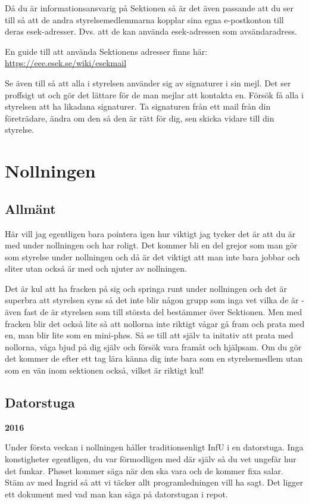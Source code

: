 \documentclass[10pt]{article}
\begin{document}
Då du är informationsansvarig på Sektionen så är det även passande att du ser till så att de andra styrelsemedlemmarna kopplar sina egna e-postkonton till deras esek-adresser. Dvs. att de kan använda esek-adressen som avsändaradress.

En guide till att använda Sektionens adresser finns här: \url{https://eee.esek.se/wiki/esekmail}

Se även till så att alla i styrelsen använder sig av signaturer i sin mejl. Det ser proffsigt ut och gör det lättare för de man mejlar att kontakta en. Försök få alla i styrelsen att ha likadana signaturer. Ta signaturen från ett mail från din företrädare, ändra om den så den är rätt för dig, sen skicka vidare till din styrelse.

\section{Nollningen}
\subsection{Allmänt}
Här vill jag egentligen bara pointera igen hur viktigt jag tycker det är att du är med under nollningen och har roligt. Det kommer bli en del grejor som man gör som styrelse under nollningen och då är det viktigt att man inte bara jobbar och sliter utan också är med och njuter av nollningen.

Det är kul att ha fracken på sig och springa runt under nollningen och det är superbra att styrelsen syns så det inte blir någon grupp som inga vet vilka de är - även fast de är styrelsen som till största del bestämmer över Sektionen. Men med fracken blir det också lite så att nollorna inte riktigt vågar gå fram och prata med en, man blir lite som en mini-ph\o s. Så se till att själv ta initativ att prata med nollorna, våga bjud på dig själv och försök vara framåt och hjälpsam. Om du gör det kommer de efter ett tag lära känna dig inte bara som en styrelsemedlem utan som en vän inom sektionen också, vilket är riktigt kul!

\subsection{Datorstuga}
\textbf{2016}

Under första veckan i nollningen håller traditionsenligt InfU i en datorstuga. Inga konstigheter egentligen, du var förmodligen med där själv så du vet ungefär hur det funkar. Ph\o set kommer säga när den ska vara och de kommer fixa salar. Stäm av med Ingrid så att vi täcker allt programledningen vill ha sagt. Det ligger ett dokument med vad man kan säga på datorstugan i repot.
\end{document}
